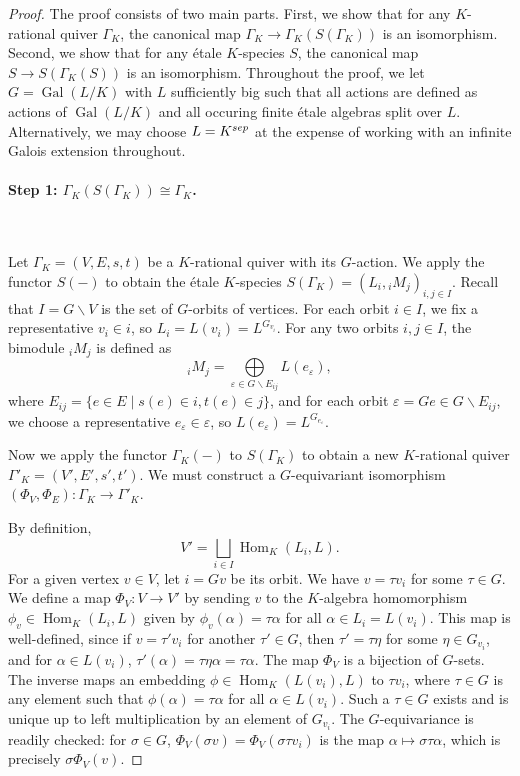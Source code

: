 \documentclass[10pt,a4paper]{amsart}
\DeclareMathOperator{\Gal}{\mathrm {Gal}}
\DeclareMathOperator{\Hom}{\mathrm{Hom}}
\begin{document}
  \begin{proof}
    The proof consists of two main parts. First, we show that for any $K$-rational quiver $\Gamma_K$, the canonical map $\Gamma_K \to \Gamma_K(S(\Gamma_K))$ is an isomorphism. Second, we show that for any \'etale $K$-species $S$, the canonical map $S \to S(\Gamma_K(S))$ is an isomorphism. Throughout the proof, we let $G = \Gal(L/K)$ with $L$ sufficiently big such that all actions are defined as actions of $\Gal(L/K)$ and all occuring finite \'etale algebras split over $L$. Alternatively, we may choose $L=K^{\rm sep}$ at the expense of working with an infinite Galois extension throughout.

    \paragraph{Step 1: $\Gamma_K(S(\Gamma_K)) \cong \Gamma_K$.}\ 

    \smallskip
    Let $\Gamma_K = (V,E,s,t)$ be a $K$-rational quiver with its $G$-action. We apply the functor $S(-)$ to obtain the \'etale $K$-species $S(\Gamma_K) = (L_i, {}_iM_j)_{i,j \in I}$. Recall that $I=G\backslash V$ is the set of $G$-orbits of vertices. For each orbit $i\in I$, we fix a representative $v_i \in i$, so $L_i=L(v_i)=L^{G_{v_i}}$. For any two orbits $i,j \in I$, the bimodule ${}_iM_j$ is defined as
    \[
      {}_iM_j = \bigoplus\limits_{\varepsilon \in G\backslash E_{ij}} L(e_\varepsilon),
    \]
    where $E_{ij}=\{e\in E \mid s(e)\in i, t(e)\in j\}$, and for each orbit $\varepsilon=Ge \in G\backslash E_{ij}$, we choose a representative $e_\varepsilon \in \varepsilon$, so $L(e_\varepsilon) = L^{G_{e_\varepsilon}}$.

    Now we apply the functor $\Gamma_K(-)$ to $S(\Gamma_K)$ to obtain a new $K$-rational quiver $\Gamma'_K = (V',E',s',t')$. We must construct a $G$-equivariant isomorphism $(\Phi_V, \Phi_E): \Gamma_K \to \Gamma'_K$.

    \smallskip
     By definition,
    \[
    V' = \bigsqcup\limits_{i\in I} \Hom_K(L_i, L).
    \]
    For a given vertex $v \in V$, let $i=Gv$ be its orbit. We have $v=\tau v_i$ for some $\tau \in G$. We define a map $\Phi_V\colon V \to V'$ by sending $v$ to the $K$-algebra homomorphism $\phi_v \in \Hom_K(L_i,L)$ given by $\phi_v(\alpha) = \tau \alpha$ for all $\alpha\in L_i = L(v_i)$. This map is well-defined, since if $v=\tau'v_i$ for another $\tau'\in G$, then $\tau'=\tau \eta$ for some $\eta\in G_{v_i}$, and for $\alpha\in L(v_i)$, $\tau'(\alpha) = \tau \eta \alpha = \tau \alpha$. The map $\Phi_V$ is a bijection of $G$-sets. The inverse maps an embedding $\phi \in \Hom_K(L(v_i),L)$ to $\tau v_i$, where $\tau\in G$ is any element such that $\phi(\alpha)=\tau \alpha$ for all $\alpha\in L(v_i)$. Such a $\tau\in G$ exists and is unique up to left multiplication by an element of $G_{v_i}$. The $G$-equivariance is readily checked: for $\sigma\in G$, $\Phi_V(\sigma v)=\Phi_V(\sigma \tau v_i)$ is the map $\alpha \mapsto \sigma \tau \alpha$, which is precisely $\sigma \Phi_V(v)$.


\end{proof}
\end{document}
